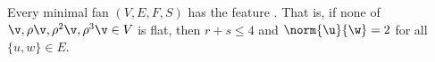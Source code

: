 %
%
%



\begin{lemma}[]
Every minimal fan $(V,E,F,S)$ has the feature .
  That is, if none of $\v,\rho
\v,\rho^2 \v,\rho^3 \v\in V$ is flat, then $r+s\le 4$ and
$\norm{\u}{\w}=2$ for all $\{u,w\}\in E$.
\end{lemma}

